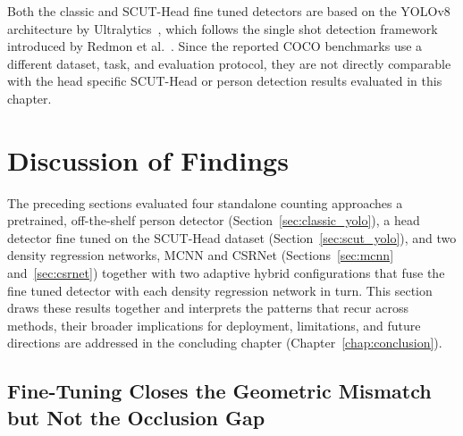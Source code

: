 Both the classic and SCUT-Head fine tuned detectors are based on the YOLOv8 architecture by Ultralytics~\cite{yolov8_ultralytics}, which follows the single shot detection framework introduced by Redmon et al.~\cite{redmon2016yolo}. Since the reported COCO benchmarks use a different dataset, task, and evaluation protocol, they are not directly comparable with the head specific SCUT-Head or person detection results evaluated in this chapter.

\section{Discussion of Findings}
\label{sec:discussion}

The preceding sections evaluated four standalone counting approaches a pretrained, off-the-shelf person detector (Section~\ref{sec:classic_yolo}), a head detector fine tuned on the SCUT-Head dataset (Section~\ref{sec:scut_yolo}), and two density regression networks, MCNN and CSRNet (Sections~\ref{sec:mcnn} and~\ref{sec:csrnet}) together with two adaptive hybrid configurations that fuse the fine tuned detector with each density regression network in turn. This section draws these results together and interprets the patterns that recur across methods, their broader implications for deployment, limitations, and future directions are addressed in the concluding chapter (Chapter~\ref{chap:conclusion}).

\subsection{Fine-Tuning Closes the Geometric Mismatch but Not the Occlusion Gap}
\label{sec:discussion_finetuning}

